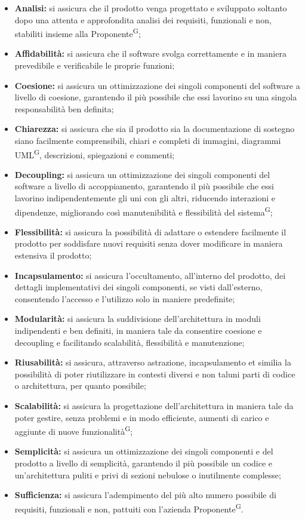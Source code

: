 \documentclass[8pt]{article}
\newcommand{\glossterm}[1]{#1\textsuperscript{G}} %
\begin{document}
\begin{itemize}
    \item \textbf{Analisi:} si assicura che il prodotto venga progettato e sviluppato soltanto dopo una attenta e approfondita analisi dei requisiti, funzionali e non, stabiliti insieme alla \glossterm{Proponente}; 
    \item \textbf{Affidabilità:} si assicura che il software svolga correttamente e in maniera prevedibile e verificabile le proprie funzioni;
    \item \textbf{Coesione:} si assicura un ottimizzazione dei singoli componenti del software a livello di coesione, garantendo il più possibile che essi lavorino su una singola responsabilità ben definita;
    \item \textbf{Chiarezza:} si assicura che sia il prodotto sia la documentazione di sostegno siano facilmente comprensibili, chiari e completi di immagini, diagrammi \glossterm{UML}, descrizioni, spiegazioni e commenti;
    \item \textbf{Decoupling:} si assicura un ottimizzazione dei singoli componenti del software a livello di accoppiamento, garantendo il più possibile che essi lavorino indipendentemente gli uni con gli altri, riducendo interazioni e dipendenze, migliorando così manutenibilità e flessibilità del \glossterm{sistema};
    \item \textbf{Flessibilità:} si assicura la possibilità di adattare o estendere facilmente il prodotto per soddisfare nuovi requisiti senza dover modificare in maniera estensiva il prodotto;
    \item \textbf{Incapsulamento:} si assicura l'occultamento, all'interno del prodotto, dei dettagli implementativi dei singoli componenti, se visti dall'esterno, consentendo l'accesso e l'utilizzo solo in maniere predefinite;
    \item \textbf{Modularità:} si assicura la suddivisione dell'architettura in moduli indipendenti e ben definiti, in maniera tale da consentire coesione e decoupling e facilitando scalabilità, flessibilità e manutenzione;
    \item \textbf{Riusabilità:} si assicura, attraverso astrazione, incapsulamento et similia la possibilità di poter riutilizzare in contesti diversi e non taluni parti di codice o architettura, per quanto possibile;
    \item \textbf{Scalabilità:} si assicura la progettazione dell'architettura in maniera tale da poter gestire, senza problemi e in modo efficiente, aumenti di carico e aggiunte di nuove \glossterm{funzionalità};
    \item \textbf{Semplicità:} si assicura un ottimizzazione dei singoli componenti e del prodotto a livello di semplicità, garantendo il più possibile un codice e un'architettura puliti e privi di sezioni nebulose o inutilmente complesse;
    \item \textbf{Sufficienza:} si assicura l'adempimento del più alto numero possibile di requisiti, funzionali e non, pattuiti con l'azienda \glossterm{Proponente}.
\end{itemize}
\end{document}
